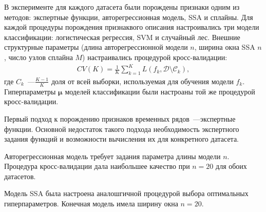 В эксперименте для каждого датасета были порождены признаки одним из методов: экспертные функции, авторегрессионная модель, SSA и сплайны.
Для каждой процедуры порождения признаквого описания настроивались три модели классификации: логистическая регрессия, SVM и случайный лес.
Внешние структурные параметры (длина авторегрессионной модели $n$, ширина окна SSA $n$, число узлов сплайна $M$) настраивались процедурой кросс-валидации:
\begin{align}\label{cv}
CV(K) = \frac{1}{K}\sum_{k=1}^{K} L(f_k, \mathcal{D}\setminus \mathcal{C}_k),
\end{align}
где $C_k$~---$\frac{K-1}{K}$ доля от всей выборки, используемая для обучения модели $f_k$.
Гиперпараметры $\boldsymbol{\mu}$ моделей классификации были настроаны той же процедурой кросс-валидации.

Первый подход к порождению признаков временных рядов~---экспертные функции.
Основной недостаток такого подхода необходимость экспертного задания функций	 и возможности вычисления их для конкретного датасета.

Авторегрессионная модель требует задания параметра длины модели $n$. 
Процедура кросс-валидации дала наибольшее качество при $n=20$ для обоих датасетов.

Модель SSA была настроена аналошгичной процедурой выбора оптимальных гиперпараметров. Конечная модель имела ширину окна $n=20$.

